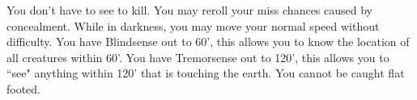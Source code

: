 \combatfeat
{You don't have to see to kill.}
{You may reroll your miss chances caused by concealment.}
{While in darkness, you may move your normal speed without difficulty.}
{You have Blindsense out to 60', this allows you to know the location of all creatures within 60'.}
{You have Tremorsense out to 120', this allows you to ``see" anything within 120' that is touching the earth.}
{You cannot be caught flat footed.}